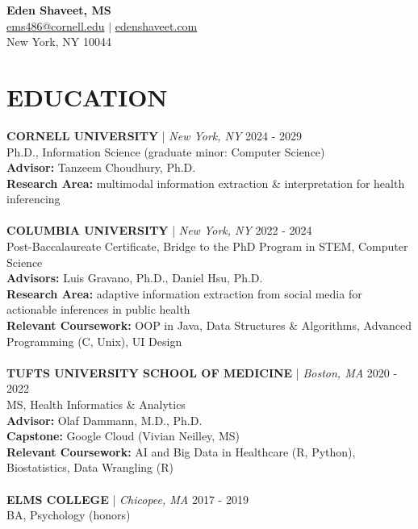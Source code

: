 \documentclass[a4paper,12pt]{article}
\begin{document}
\begin{center}
    {\LARGE \textbf{Eden Shaveet, MS}}\\[0.5cm]
    \href{mailto:ems486@cornell.edu}{ems486@cornell.edu} $\vert$
    \href{https://www.edenshaveet.com}{edenshaveet.com} \\
    New York, NY 10044 \\
\end{center}

\section*{EDUCATION}
\textbf{CORNELL UNIVERSITY} | \textit{New York, NY} \hfill 2024 - 2029\\
Ph.D., Information Science (graduate minor: Computer Science) \\
\small{\textbf{Advisor:} Tanzeem Choudhury, Ph.D.} \\
\small{\textbf{Research Area:} multimodal information extraction \& interpretation for health inferencing}\\
\\
\textbf{COLUMBIA UNIVERSITY} | \textit{New York, NY} \hfill 2022 - 2024\\
Post-Baccalaureate Certificate, Bridge to the PhD Program in STEM, Computer Science \\
\small{\textbf{Advisors:} Luis Gravano, Ph.D., Daniel Hsu, Ph.D.} \\
\small{\textbf{Research Area:} adaptive information extraction from social media for actionable inferences in public health}\\
\small{\textbf{Relevant Coursework:} OOP in Java, Data Structures \& Algorithms, Advanced Programming (C, Unix), UI Design}\\
\\
\textbf{TUFTS UNIVERSITY SCHOOL OF MEDICINE} | \textit{Boston, MA} \hfill 2020 - 2022\\
MS, Health Informatics \& Analytics \\
\small{\textbf{Advisor:} Olaf Dammann, M.D., Ph.D.} \\
\small{\textbf{Capstone:} Google Cloud (Vivian Neilley, MS)}\\
\small{\textbf{Relevant Coursework:} AI and Big Data in Healthcare (R, Python), Biostatistics, Data Wrangling (R)}\\
\\
\textbf{ELMS COLLEGE} | \textit{Chicopee, MA} \hfill 2017 - 2019\\
BA, Psychology (honors) \\
\end{document}
